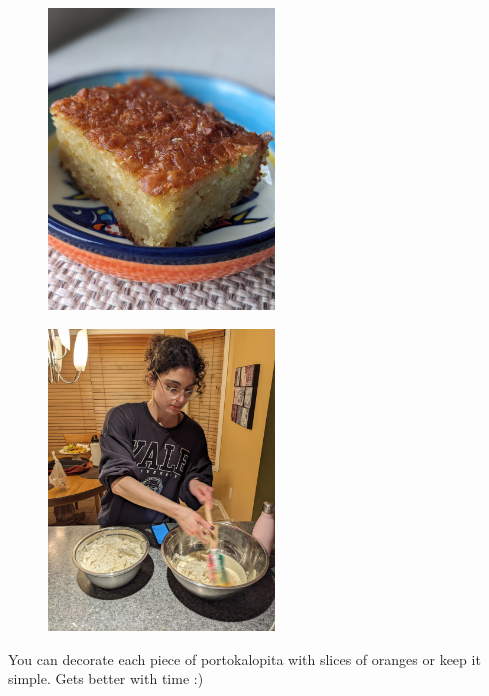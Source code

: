 \begin{figure}
  \includegraphics[width=60mm]{monanteras/images/portokalopita.jpg}
\end{figure}
\begin{figure}
  \includegraphics[width=60mm]{monanteras/images/portokalopita2.jpg}
\end{figure}

You can decorate each piece of portokalopita with slices of oranges or keep it simple. Gets better with time :)

